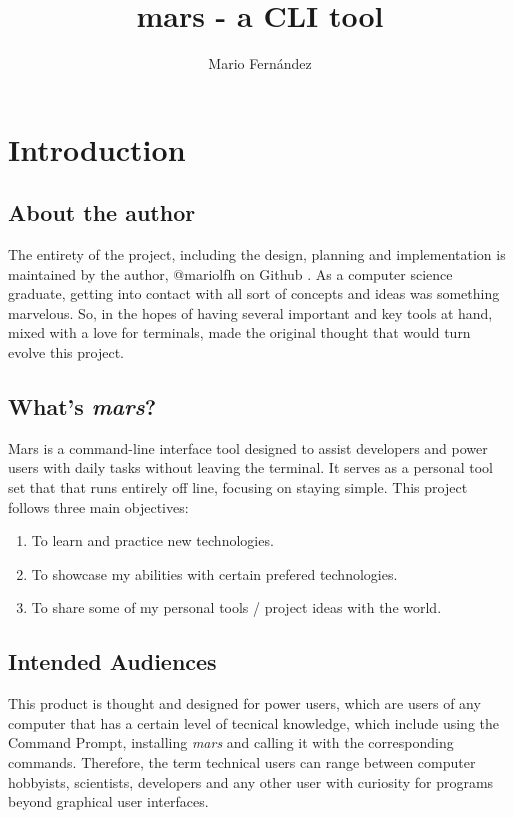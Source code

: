\documentclass{report}
\title{mars - a CLI tool}
\author{Mario Fernández}
\begin{document}
\maketitle

\tableofcontents

\chapter{Introduction}
\section{About the author}
The entirety of the project, including the design, planning and implementation is maintained by the author, @mariolfh on Github \cite{githubinc.MariolfhOverview2025}. As a computer science graduate, getting into contact with all sort of concepts and ideas was something marvelous. So, in the hopes of having several important and key tools at hand, mixed with a love for terminals, made the original thought that would turn evolve this project. 

\section{What's \emph{mars}?}
Mars is a command-line interface tool designed to assist developers and power users with daily tasks without leaving the terminal. It serves as a personal tool set that that runs entirely off line, focusing on staying simple.
This project follows three main objectives:
\begin{enumerate}
\item{To learn and practice new technologies.}
\item{To showcase my abilities with certain prefered technologies.}
\item{To share some of my personal tools / project ideas with the world.}
\end{enumerate}

\section{Intended Audiences}
This product is thought and designed for power users, which are users of any computer that has a certain level of tecnical knowledge, which include using the Command Prompt, installing \emph{mars} and calling it with the corresponding commands. Therefore, the term technical users can range between computer hobbyists, scientists, developers and any other user with curiosity for programs beyond graphical user interfaces.
\end{document}
